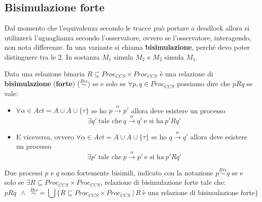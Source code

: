 \subsection{Bisimulazione forte}
Dal momento che l'equivalenza secondo le tracce può portare a deadlock
allora si utilizzerà l'uguaglianza secondo l'osservatore, ovvero se l'osservatore,
interagendo, non nota differenze. In una variante si chiama \textbf{bisimulazione},
perché devo poter distinguere tra le 2. In sostanza $M_1$ simula $M_2$ e $M_2$
simula $M_1$.
\begin{definizione}
    Data una relazione binaria $R \subseteq Proc_{CCS} \times Proc_{CCS}$ è una
    relazione di \textbf{bisimulazione} (\textbf{forte}) ($\stackrel{Bis}{\sim}$)
    se e solo se $\forall p, q \in Proc_{CCS}$ possiamo dire che $p R q$ se vale:
    \begin{itemize}
        \item $\forall \alpha \in Act = A \cup \overline{A} \cup \{\tau\}$ se ho
              $p \xrightarrow{\alpha} p'$ allora deve esistere un processo
              \begin{equation}
                  \exists q' \ \text{tale che} \ q \xrightarrow{\alpha} q' \
                  \text{e si ha} \ p'Rq'
              \end{equation}
        \item E viceversa, ovvero $\forall \alpha \in Act = A \cup \overline{A}
                  \cup \{\tau\}$
              se ho $q \xrightarrow{\alpha} q'$ allora deve esistere un processo
              \begin{equation}
                  \exists p' \ \text{tale che} \ p \xrightarrow{\alpha} p' \
                  \text{e si ha} \ p'Rq'
              \end{equation}
    \end{itemize}
    Due processi $p$ e $q$ sono fortemente bisimili, indicato con la notazione
    $p \stackrel{Bis}{\sim} q$ se e solo se $\exists R \subseteq Proc_{CCS} \times
        Proc_{CCS}$, relazione di bisimulazione forte tale che:
    \begin{equation}
        p R q \ \ \land \ \
        \stackrel{Bis}{\sim} = \bigcup \{R \subseteq Proc_{CCS} \times Proc_{CCS}
        \ | \ R \ \text{è una relazione di bisimulazione forte}\}
    \end{equation}
\end{definizione}
